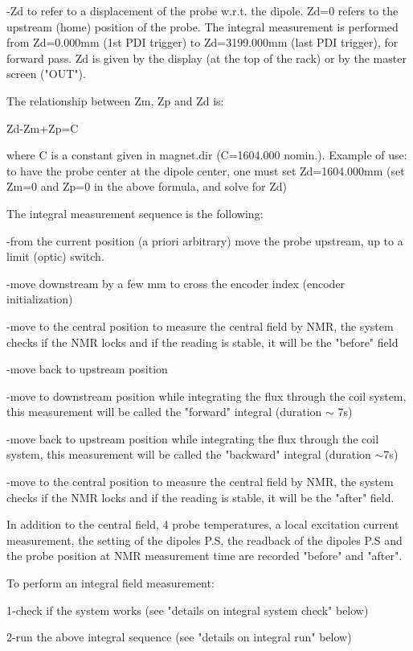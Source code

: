 {-Zd to refer to a displacement of the probe w.r.t. the dipole. Zd=0 refers to
the upstream (home) position of the probe. The integral measurement is performed
from Zd=0.000mm (1st PDI trigger) to Zd=3199.000mm (last PDI trigger), for forward
pass. Zd is given by the display (at the top of the rack) or by the master screen
("OUT"). 

The relationship between Zm, Zp and Zd is: 

Zd-Zm+Zp=C 

where C is a constant given in magnet.dir (C=1604.000 nomin.). Example of use:
to have the probe center at the dipole center, one must set Zd=1604.000mm (set
Zm=0 and Zp=0 in the above formula, and solve for Zd) 

The integral measurement sequence is the following: 

-from the current position (a priori arbitrary) move the probe upstream, up
to a limit (optic) switch. 

-move downstream by a few mm to cross the encoder index (encoder initialization) 

-move to the central position to measure the central field by NMR, the system
checks if the NMR locks and if the reading is stable, it will be the 
"before"
field 

-move back to upstream position 

-move to downstream position while integrating the flux through the coil system,
this measurement will be called the "forward" integral (duration
\( \sim  \) 7s) 

-move back to upstream position while integrating the flux through the coil
system, this measurement will be called the "backward" integral
(duration \( \sim  \)7s) 

-move to the central position to measure the central field by NMR, the system
checks if the NMR locks and if the reading is stable, it will be the 
"after"
field. 

In addition to the central field, 4 probe temperatures, a local excitation current
measurement, the setting of the dipoles P.S, the readback of the dipoles P.S
and the probe position at NMR measurement time are recorded 
"before"
and "after". 

To perform an integral field measurement: 

1-check if the system works (see "details on integral system 
check"
below) 

2-run the above integral sequence (see "details on integral run"
below) 

}
